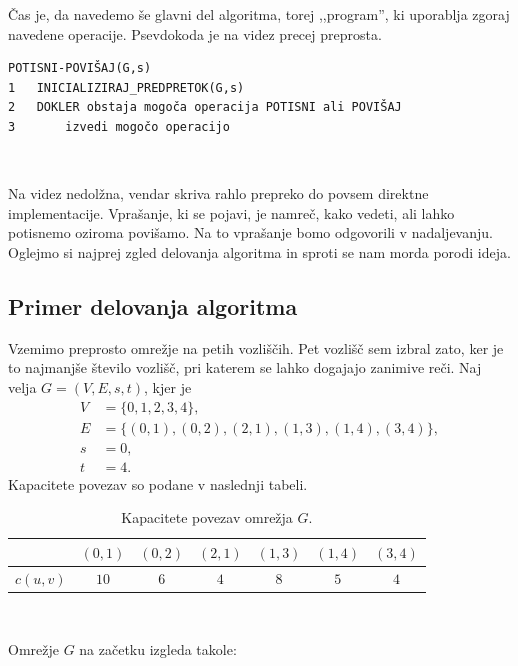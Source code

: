 \documentclass[mat1]{fmfdelo}
\begin{document}
Čas je, da navedemo še glavni del algoritma, torej ,,program'', ki uporablja zgoraj navedene operacije. Psevdokoda je na videz precej preprosta.\\

\begin{verbatim}
POTISNI-POVIŠAJ(G,s)
1   INICIALIZIRAJ_PREDPRETOK(G,s)
2   DOKLER obstaja mogoča operacija POTISNI ali POVIŠAJ
3       izvedi mogočo operacijo
\end{verbatim}~

Na videz nedolžna, vendar skriva rahlo prepreko do povsem direktne im\-ple\-men\-ta\-ci\-je. Vprašanje, ki se pojavi, je namreč, kako vedeti, ali lahko potisnemo oziroma po\-vi\-ša\-mo. Na to vprašanje bomo odgovorili v nadaljevanju. Oglejmo si najprej zgled delovanja algoritma in sproti se nam morda porodi ideja.\\

\subsection{Primer delovanja algoritma}

Vzemimo preprosto omrežje na petih vozliščih. Pet vozlišč sem izbral zato, ker je to najmanjše število vozlišč, pri katerem se lahko dogajajo zanimive reči. Naj velja $G = (V, E, s, t)$, kjer je
\begin{align*}
	V &= \{0,1,2,3,4\},\\
	E &= \{(0,1), (0,2), (2,1), (1,3), (1,4), (3,4)\},\\
	s &= 0,\\
	t &= 4.
\end{align*}
Kapacitete povezav so podane v naslednji tabeli.

\begin{table}[h!]
\centering
\caption{Kapacitete povezav omrežja $G$.}
\begin{tabular}{|l|c|c|c|c|c|c|}
\hline
         & $(0,1)$ & $(0,2)$ & $(2,1)$ & $(1,3)$ & $(1,4)$ & $(3,4)$\\ \hline
$c(u,v)$ &   $10$  &   $6$   &   $4$   &   $8$   &   $5$   &   $4$  \\ \hline
\end{tabular}
\end{table}~

Omrežje $G$ na začetku izgleda takole:
\end{document}
